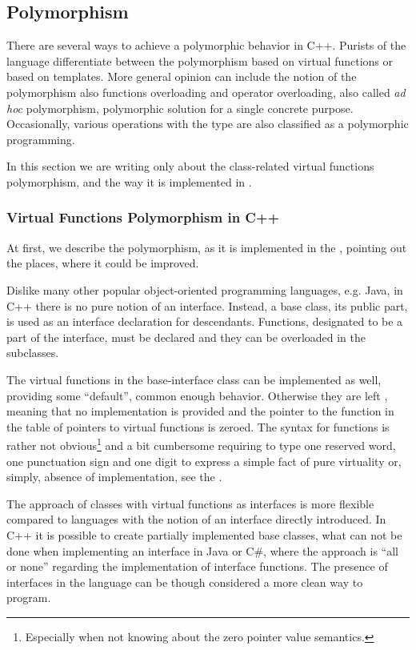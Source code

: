 \subsection{Polymorphism}

There are several ways to achieve a polymorphic behavior in C++. Purists of the language differentiate 
between the polymorphism based on virtual functions or based on templates. More general opinion can include
the notion of the polymorphism also functions overloading and operator overloading, also called 
\emph{ad hoc} polymorphism, polymorphic solution for a single concrete purpose. 
Occasionally, various operations with the  type are also classified as a polymorphic programming.

In this section we are writing only about the class-related virtual functions polymorphism, and the way it is 
implemented in \pcpp.

\subsubsection{Virtual Functions Polymorphism in C++}
\label{cpppolydefs}

At first, we describe the polymorphism, as it is implemented in the \cpppl, pointing out the places, where it could be improved.

Dislike many other popular object-oriented programming languages, e.g. Java, in C++ there is no pure notion of
an interface. Instead, a base class, its public part, is used as an interface declaration for descendants. 
Functions, designated to be a part of the interface, must be declared  and they can be overloaded in
the subclasses.

The virtual functions in the base-interface class can be implemented as well, providing some ``default'',
common enough behavior. Otherwise they are left , meaning that no implementation is provided
and the pointer to the function in the table of pointers to virtual functions is zeroed. The syntax
for  functions is rather not obvious\footnote{Especially when not knowing about the zero pointer value semantics.}
and a bit cumbersome requiring to type one reserved word, one punctuation sign and one digit to 
express a simple fact of pure virtuality or, simply, absence of implementation, see the .


The approach of classes with virtual functions as interfaces is more flexible compared to languages with the notion 
of an interface directly introduced.
In C++ it is possible to create partially implemented base classes, what can not be done when implementing
an interface in Java or C\#, where the approach is ``all or none'' regarding the implementation of interface
functions. The presence of interfaces in the language can be though considered a more clean way to program.

